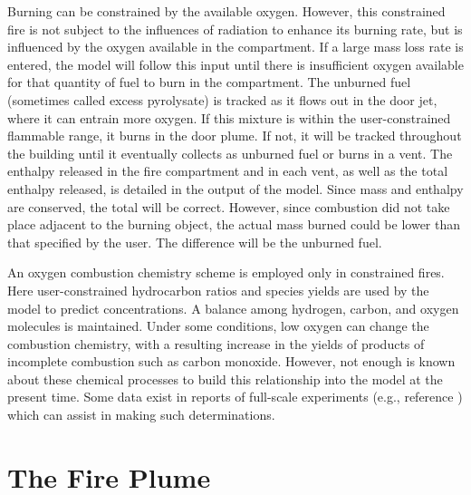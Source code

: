 Burning can be constrained by the available oxygen.  However, this constrained fire is not subject to the influences of radiation to enhance its burning rate, but is influenced by the oxygen available in the compartment.  If a large mass loss rate is entered, the model will follow this input until there is insufficient oxygen available for that quantity of fuel to burn in the compartment.  The unburned fuel (sometimes called excess pyrolysate) is tracked as it flows out in the door jet, where it can entrain more oxygen.  If this mixture is within the user-constrained flammable range, it burns in the door plume.  If not, it will be tracked throughout the building until it eventually collects as unburned fuel or burns in a vent.  The enthalpy released in the fire compartment and in each vent, as well as the total enthalpy released, is detailed in the output of the model.  Since mass and enthalpy are conserved, the total will be correct.  However, since combustion did not take place adjacent to the burning object, the actual mass burned could be lower than that specified by the user.  The difference will be the unburned fuel.

An oxygen combustion chemistry scheme is employed only in constrained fires.  Here user-constrained hydrocarbon ratios and species yields are used by the model to predict concentrations.  A balance among hydrogen, carbon, and oxygen molecules is maintained.  Under some conditions, low oxygen can change the combustion chemistry, with a resulting increase in the yields of products of incomplete combustion such as carbon monoxide. However, not enough is known about these chemical processes to build this relationship into the model at the present time.  Some data exist in reports of full-scale experiments (e.g., reference \cite{Lee:1982}) which can assist in making such determinations.




\chapter{The Fire Plume}


